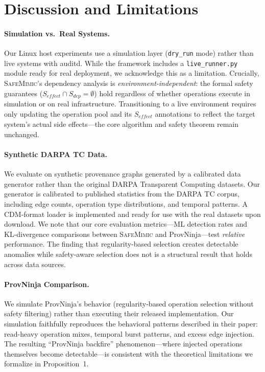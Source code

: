 \section{Discussion and Limitations}
\label{sec:discussion}

\paragraph{Simulation vs.\ Real Systems.}
Our Linux host experiments use a simulation layer (\texttt{dry\_run} mode) rather than live systems with auditd.
While the framework includes a \texttt{live\_runner.py} module ready for real deployment, we acknowledge this as a limitation.
Crucially, \textsc{SafeMimic}'s dependency analysis is \emph{environment-independent}: the formal safety guarantees ($S_{\mathit{effect}} \cap S_{\mathit{dep}} = \emptyset$) hold regardless of whether operations execute in simulation or on real infrastructure.
Transitioning to a live environment requires only updating the operation pool and its $S_{\mathit{effect}}$ annotations to reflect the target system's actual side effects---the core algorithm and safety theorem remain unchanged.

\paragraph{Synthetic DARPA TC Data.}
We evaluate on synthetic provenance graphs generated by a calibrated data generator rather than the original DARPA Transparent Computing datasets.
Our generator is calibrated to published statistics from the DARPA TC corpus, including edge counts, operation type distributions, and temporal patterns.
A CDM-format loader is implemented and ready for use with the real datasets upon download.
We note that our core evaluation metrics---ML detection rates and KL-divergence comparisons between \textsc{SafeMimic} and ProvNinja---test \emph{relative} performance.
The finding that regularity-based selection creates detectable anomalies while safety-aware selection does not is a structural result that holds across data sources.

\paragraph{ProvNinja Comparison.}
We simulate ProvNinja's behavior (regularity-based operation selection without safety filtering) rather than executing their released implementation.
Our simulation faithfully reproduces the behavioral patterns described in their paper: read-heavy operation mixes, temporal burst patterns, and excess edge injection.
The resulting ``ProvNinja backfire'' phenomenon---where injected operations themselves become detectable---is consistent with the theoretical limitations we formalize in Proposition~1.

